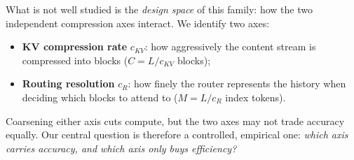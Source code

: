 What is not well studied is the \emph{design space} of this family: how the
two independent compression axes interact. We identify two axes:
\begin{itemize}
  \item \textbf{KV compression rate} $c_{KV}$: how aggressively the content
        stream is compressed into blocks ($C = L / c_{KV}$ blocks);
  \item \textbf{Routing resolution} $c_R$: how finely the router represents
        the history when deciding which blocks to attend to
        ($M = L / c_R$ index tokens).
\end{itemize}
Coarsening either axis cuts compute, but the two axes may not trade
accuracy equally. Our central question is therefore a controlled, empirical
one: \emph{which axis carries accuracy, and which axis only buys
efficiency?}

